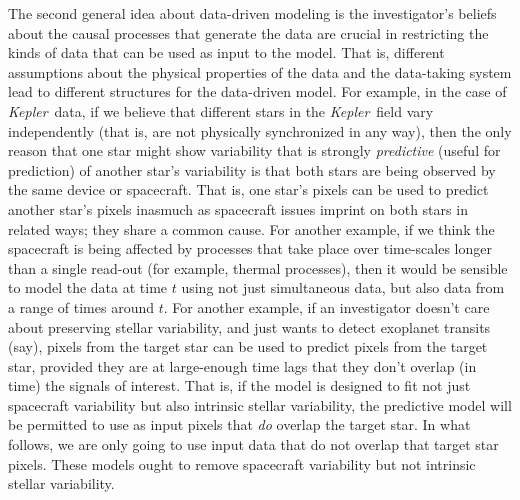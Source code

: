 \documentclass[12pt, preprint]{aastex}
\newcommand{\project}[1]{\textsl{#1}}
\newcommand{\Kepler}{\project{Kepler}}
\begin{document}
The second general idea about data-driven modeling is the investigator's beliefs
  about the causal processes that generate the data
  are crucial in restricting the kinds of data that can be used as input to the model.
That is, different assumptions about the physical properties of the data
  and the data-taking system
  lead to different structures for the data-driven model.
For example, in the case of \Kepler\ data,
  if we believe that different stars in the \Kepler\ field vary independently
  (that is, are not physically synchronized in any way),
  then the only reason that one star might show variability that is strongly \emph{predictive}
  (useful for prediction) of another star's variability
  is that both stars are being observed by the same device or spacecraft.
That is, one star's pixels can be used to predict another star's pixels
  inasmuch as spacecraft issues imprint on both stars in related ways;
  they share a common cause.
For another example, if we think the spacecraft is being affected by
  processes that take place over time-scales longer than a single read-out
  (for example, thermal processes),
  then it would be sensible to model the data at time $t$ using not just simultaneous data,
  but also data from a range of times around $t$.
For another example, if an investigator doesn't care about preserving stellar variability,
  and just wants to detect exoplanet transits (say),
  pixels from the target star can be used to predict pixels from the target star,
  provided they are at large-enough time lags that they don't overlap (in time)
  the signals of interest.
That is, if the model is designed to fit not just spacecraft variability
  but also intrinsic stellar variability,
  the predictive model will be permitted to use as input pixels that \emph{do} overlap the target star.
In what follows, we are only going to use input data that do not overlap that target star pixels.
These models ought to remove spacecraft variability but not intrinsic stellar variability.
\end{document}
